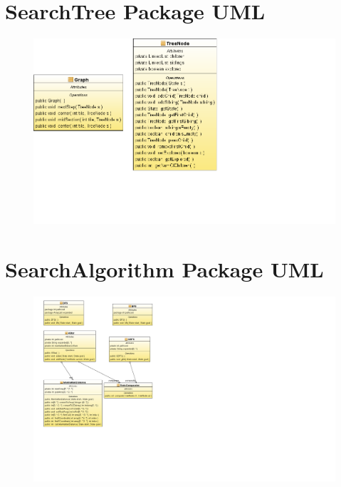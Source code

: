 \documentclass[journal]{IEEEtran}
\begin{document}
\newpage
\section{SearchTree Package UML}\label{searchTreeUML}
\begin{figure}[h]
\centering
\includegraphics[width=1.4\textwidth,natwidth=610,natheight=642]{../Model/CSM6120_Assignment2-Model/ClassDiagram3.png} 

\end{figure}

\newpage
\section{SearchAlgorithm Package UML}\label{searchAlgorithmUML}
\begin{figure}[h]
\centering
\includegraphics[width=1.6\textwidth,natwidth=610,natheight=642]{../Model/CSM6120_Assignment2-Model/ClassDiagram2.png} 

\end{figure}
\end{document}
